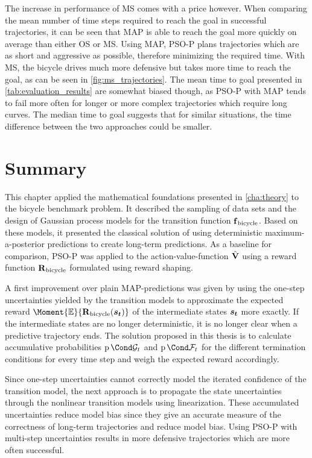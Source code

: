 The increase in performance of MS comes with a price however.
When comparing the mean number of time steps required to reach the goal in successful trajectories, it can be seen that MAP is able to reach the goal more quickly on average than either OS or MS.
Using MAP, PSO-P plans trajectories which are as short and aggressive as possible, therefore minimizing the required time.
With MS, the bicycle drives much more defensive but takes more time to reach the goal, as can be seen in \cref{fig:ms_trajectories}.
The mean time to goal presented in \cref{tab:evaluation_results} are somewhat biased though, as PSO-P with MAP tends to fail more often for longer or more complex trajectories which require long curves.
The median time to goal suggests that for similar situations, the time difference between the two approaches could be smaller.

\section{Summary}
This chapter applied the mathematical foundations presented in \cref{cha:theory} to the bicycle benchmark problem.
It described the sampling of data sets and the design of Gaussian process models for the transition function $\operatorname{\operatorname{\mathbf{f}}_{\text{bicycle}}}$.
Based on these models, it presented the classical solution of using deterministic maximum-a-posterior predictions to create long-term predictions.
As a baseline for comparison, PSO-P was applied to the action-value-function $\operatorname{\hat{\operatorname{\mathbf{V}}}}$ using a reward function $\operatorname{\operatorname{\mathbf{R}}_{\text{bicycle}}}$ formulated using reward shaping.

A first improvement over plain MAP-predictions was given by using the one-step uncertainties yielded by the transition models to approximate the expected reward $\Moment{\E}{\RwdBicycle(\rv{s_t})}$ of the intermediate states $\bm{s_t}$ more exactly.
If the intermediate states are no longer deterministic, it is no longer clear when a predictive trajectory ends.
The solution proposed in this thesis is to calculate accumulative probabilities $\Prob{\PGoal_t}$ and $\Prob{\PFallen_t}$ for the different termination conditions for every time step and weigh the expected reward accordingly.

Since one-step uncertainties cannot correctly model the iterated confidence of the transition model, the next approach is to propagate the state uncertainties through the nonlinear transition models using linearization.
These accumulated uncertainties reduce model bias since they give an accurate measure of the correctness of long-term trajectories and reduce model bias.
Using PSO-P with multi-step uncertainties results in more defensive trajectories which are more often successful.
